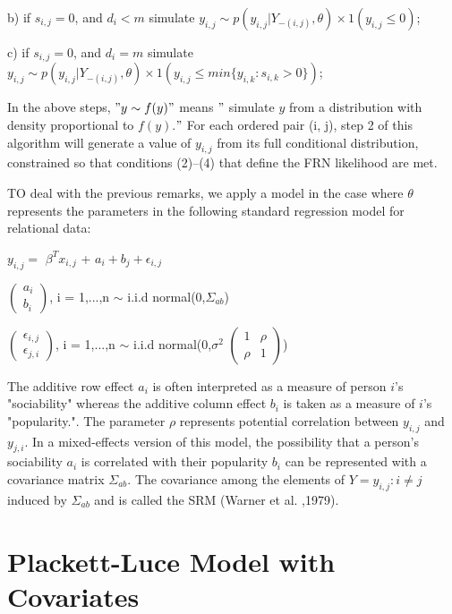 \documentclass[12pt]{ociamthesis}  %
\begin{document}
	b)  if $s_{i,j} = 0$, and $d_{i} < m$ simulate $y_{i,j} \sim p(y_{i,j}| Y_{-(i,j)}, \theta) \times 1(y_{i,j} \leq 0)$;
	
	c) if $s_{i,j} = 0$, and $d_{i} = m$ simulate $y_{i,j} \sim p(y_{i,j}| Y_{-(i,j)}, \theta) \times 1(y_{i,j} \leq min \{ y_{i,k} : s_{i,k} > 0 \})$;
	
	In the above steps, $"y \sim f(y)"$ means $"$ simulate $y$ from a distribution with density proportional
	to $f(y)$.$ " $ For each ordered pair (i, j), step 2 of this algorithm will generate a value of $y_{i,j}$ from
	its full conditional distribution, constrained so that conditions (2)–(4) that define the FRN likelihood are met.
	
	TO deal with the previous remarks, we apply a model in the case where $\theta$  represents the parameters in the following standard regression model for relational data:
	
	$y_{i,j} = $ \boldmath $\beta^{T} {x_{i,j}}$ \unboldmath + $a_{i} + b_{j} + \epsilon_{i,j}$
	
	\(
	\begin{pmatrix}
	a_{i} \\
	b_{i}
	\end{pmatrix}
	\), i = 1,...,n $\sim $ i.i.d normal(0,$\Sigma_{ab}$)
	
	\(
	\begin{pmatrix}
	\epsilon_{i,j} \\
	\epsilon_{j,i}
	\end{pmatrix}
	\), i = 1,...,n $\sim $ i.i.d normal(0,$\sigma^{2}$ $\begin{pmatrix} 1 & \rho \\ \rho & 1 \end{pmatrix}$)
	
	The additive row effect $a_{i}$ is often interpreted as a measure of person $i$’s "sociability" whereas the additive column effect $b_{i}$ is taken as a measure of $i$’s "popularity.". The parameter $\rho$ represents potential correlation between $y_{i,j} $ and $y_{j,i}$. In a mixed-effects version
	of this model, the possibility that a person’s sociability $a_{i}$ is correlated with their popularity $b_{i}$ can be represented with a covariance matrix $\Sigma_{ab}$. The covariance among the elements of $Y = {y_{i,j} : i \neq j}$ induced by $\Sigma_{ab}$ and is called the SRM (Warner et al. ,1979).
	
	\section{Plackett-Luce Model with Covariates}
	
\end{document}
